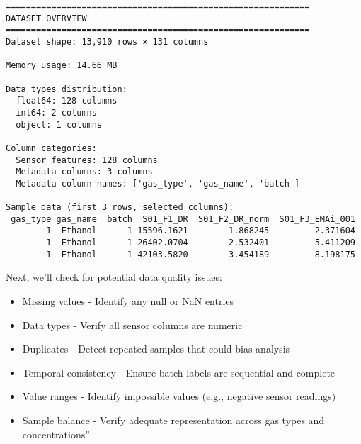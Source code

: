 \documentclass[
  letterpaper,
  DIV=11,
  numbers=noendperiod]{scrartcl}
\providecommand{\tightlist}{%
  \setlength{\itemsep}{0pt}\setlength{\parskip}{0pt}}
\begin{document}
\begin{verbatim}
============================================================
DATASET OVERVIEW
============================================================
Dataset shape: 13,910 rows × 131 columns

Memory usage: 14.66 MB

Data types distribution:
  float64: 128 columns
  int64: 2 columns
  object: 1 columns

Column categories:
  Sensor features: 128 columns
  Metadata columns: 3 columns
  Metadata column names: ['gas_type', 'gas_name', 'batch']

Sample data (first 3 rows, selected columns):
 gas_type gas_name  batch  S01_F1_DR  S01_F2_DR_norm  S01_F3_EMAi_001
        1  Ethanol      1 15596.1621        1.868245         2.371604
        1  Ethanol      1 26402.0704        2.532401         5.411209
        1  Ethanol      1 42103.5820        3.454189         8.198175
\end{verbatim}

Next, we'll check for potential data quality issues:

\begin{itemize}
\tightlist
\item
  Missing values - Identify any null or NaN entries
\item
  Data types - Verify all sensor columns are numeric
\item
  Duplicates - Detect repeated samples that could bias analysis
\item
  Temporal consistency - Ensure batch labels are sequential and complete
\item
  Value ranges - Identify impossible values (e.g., negative sensor
  readings)
\item
  Sample balance - Verify adequate representation across gas types and
  concentrations''
\end{itemize}
\end{document}
